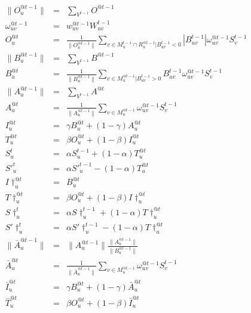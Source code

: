 \begin{eqnarray}
\label{eq:c2:o-norm}
\|O_{u}^{@t-1}\| & = & \sum_{V^{t-1}}O^{@t-1} \\
\label{eq:c2:omega}
\omega_{uv}^{@t-1} & = & w_{uv}^{@t-1}W_{uv}^{t-1} \\
\label{eq:c2:o}
O_{u}^{@t} & = & \frac{1}{\|O_{u}^{@t-1}\|}\sum_{v\in M_{u}^{t-1}\cap R_{u}^{@t-1}|
B_{uv}^{t-1}<0}|B_{uv}^{t-1}|\omega_{uv}^{@t-1}S_{v}^{t-1} \\
\label{eq:c2:b-norm}
\|B_{u}^{@t-1}\| & = & \sum_{V^{t-1}}B^{@t-1} \\
\label{eq:c2:b}
B_{u}^{@t} & = & \frac{1}{\|B_{u}^{@t-1}\|}\sum_{v\in M_{u}^{@t-1}|B_{uv}^{t-1}>0}B_{uv}^{t-1}\omega_{uv}^{@t-1}S_{v}^{t-1} \\
\label{eq:c2:a-norm}
\|A_{u}^{@t-1}\| & = & \sum_{V^{t-1}}A^{@t} \\
\label{eq:c2:a}
A_{u}^{@t} & = & \frac{1}{\|A_{u}^{@t-1}\|}\sum_{v\in M_{u}^{@t-1}}\omega_{uv}^{@t-1}S_{v}^{t-1} \\
\label{eq:c2:i}
I_{u}^{@t} & = & \gamma B_{u}^{@t}+(1-\gamma)A_{u}^{@t} \\
\label{eq:c2:t}
T_{u}^{@t} & = &\beta O_{u}^{@t}+(1-\beta)I_{u}^{@t} \\
\label{eq:c2:s}
S_{u}^{t} & = & \alpha S_{u}^{t-1}+(1-\alpha)T_{u}^{@t} \\
\label{eq:c2:s-neg}
{S'}_{u}^{t} & = & \alpha {S'}_{u}^{t-1}-(1-\alpha)T_{u}^{@t} \\
\label{eq:c2:i-noinall}
I\dagger_{u}^{@t} & = & B_{u}^{@t} \\
\label{eq:c2:t-noinall}
T\dagger_{u}^{@t} & = &\beta O_{u}^{@t}+(1-\beta)I\dagger_{u}^{@t} \\
\label{eq:c2:s-noinall}
S\dagger_{u}^{t} & = & \alpha S\dagger_{u}^{t-1}+(1-\alpha)T\dagger_{u}^{@t} \\
\label{eq:c2:s-neg-noinall}
S'\dagger_{u}^{t} & = & \alpha S'\dagger_{u}^{t-1}-(1-\alpha)T\dagger_{u}^{@t} \\
\label{eq:c2:a-norm-byb}
\|\bar{A}_{u}^{@t-1}\| & = & \|A_{u}^{@t-1}\| \frac{\|A_{u}^{@t-1}\|}{\|B_{u}^{@t-1}\|} \\
\label{eq:c2:a-byb}
\bar{A}_{u}^{@t} & = & \frac{1}{\|\bar{A}_{u}^{@t-1}\|}\sum_{v\in M_{u}^{@t-1}}\omega_{uv}^{@t-1}S_{v}^{t-1} \\
\label{eq:c2:i-byb}
\bar{I}_{u}^{@t} & = & \gamma B_{u}^{@t}+(1-\gamma)\bar{A}_{u}^{@t} \\
\label{eq:c2:t-byb}
\bar{T}_{u}^{@t} & = &\beta O_{u}^{@t}+(1-\beta)\bar{I}_{u}^{@t} \\

\end{eqnarray}
